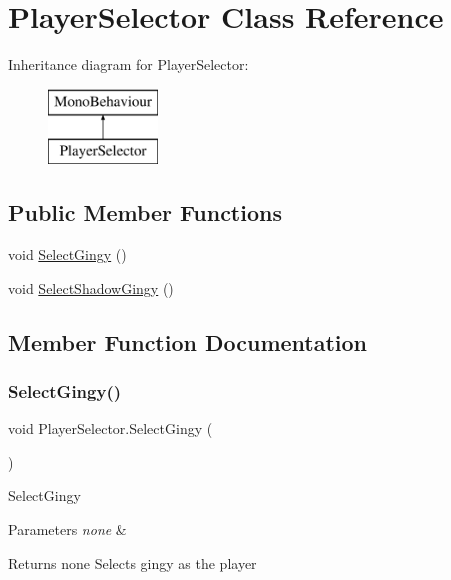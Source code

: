 \hypertarget{class_player_selector}{}\section{Player\+Selector Class Reference}
\label{class_player_selector}
Inheritance diagram for Player\+Selector\+:\begin{figure}[H]
\begin{center}
\leavevmode
\includegraphics[height=2.000000cm]{class_player_selector}
\end{center}
\end{figure}
\subsection*{Public Member Functions}
\begin{DoxyCompactItemize}
\item 
void \mbox{\hyperlink{class_player_selector_a8114972f187d61d0a9b7e746bf667b1c}{Select\+Gingy}} ()
\item 
void \mbox{\hyperlink{class_player_selector_a310dcc76ad225744be3a0f898c8aea38}{Select\+Shadow\+Gingy}} ()
\end{DoxyCompactItemize}


\subsection{Member Function Documentation}
\mbox{\label{class_player_selector_a8114972f187d61d0a9b7e746bf667b1c}} 
\subsubsection{\texorpdfstring{Select\+Gingy()}{SelectGingy()}}
{\footnotesize\ttfamily void Player\+Selector.\+Select\+Gingy (\begin{DoxyParamCaption}{ }\end{DoxyParamCaption})\hspace{0.3cm}{\ttfamily [inline]}}

Select\+Gingy 
\begin{DoxyParams}{Parameters}
{\em none} & \\
\hline
\end{DoxyParams}
\begin{DoxyReturn}{Returns}
none Selects gingy as the player 
\end{DoxyReturn}
\mbox{\label{class_player_selector_a310dcc76ad225744be3a0f898c8aea38}} 
